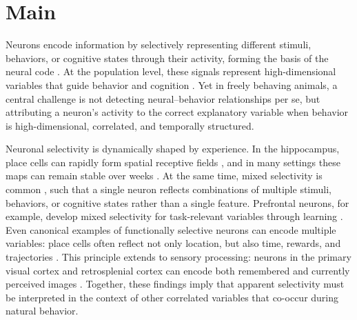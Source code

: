 \section{Main}
\label{sec:main}

Neurons encode information by selectively representing different stimuli, behaviors, or cognitive states through their activity, forming the basis of the neural code \cite{DayanAbbott2001}. At the population level, these signals represent high-dimensional variables that guide behavior and cognition \cite{Averbeck2006}. Yet in freely behaving animals, a central challenge is not detecting neural–behavior relationships per se, but attributing a neuron’s activity to the correct explanatory variable when behavior is high-dimensional, correlated, and temporally structured. 

Neuronal selectivity is dynamically shaped by experience. In the hippocampus, place cells can rapidly form spatial receptive fields \cite{Sotskov2022}, and in many settings these maps can remain stable over weeks \cite{Wilson1993, Thompson1990}. At the same time, mixed selectivity is common  \cite{TyeMiller2024}, such that a single neuron reflects combinations of multiple stimuli, behaviors, or cognitive states rather than a single feature. Prefrontal neurons, for example, develop mixed selectivity for task-relevant variables through learning \cite{mix3, Mante2013}. Even canonical examples of functionally selective neurons can encode multiple variables: place cells often reflect not only location, but also time, rewards, and trajectories \cite{Zheng2021, Lian2022}. This principle extends to sensory processing: neurons in the primary visual cortex and retrosplenial cortex can encode both remembered and currently perceived images \cite{Makino2015}. Together, these findings imply that apparent selectivity must be interpreted in the context of other correlated variables that co-occur during natural behavior. 

